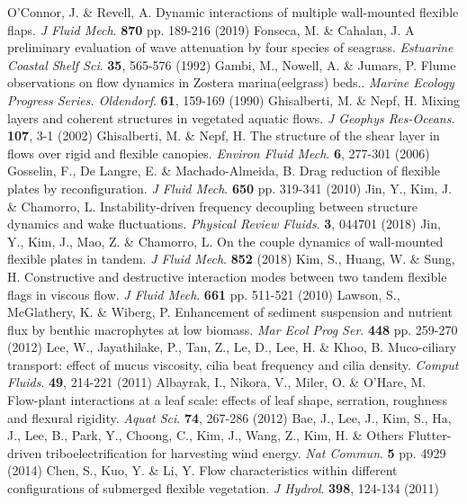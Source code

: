 \documentclass[lineno,authoryear]{FLO_v1}%
\theoremstyle{definition}
\begin{document}
\begin{Backmatter}
\begin{thebibliography}{}
O’Connor, J. \& Revell, A. Dynamic interactions of multiple wall-mounted flexible flaps. {\em J Fluid Mech}. \textbf{870} pp. 189-216 (2019)
Fonseca, M. \& Cahalan, J. A preliminary evaluation of wave attenuation by four species of seagrass. {\em Estuarine Coastal Shelf Sci}. \textbf{35}, 565-576 (1992)
Gambi, M., Nowell, A. \& Jumars, P. Flume observations on flow dynamics in Zostera marina(eelgrass) beds.. {\em Marine Ecology Progress Series. Oldendorf}. \textbf{61}, 159-169 (1990)
Ghisalberti, M. \& Nepf, H. Mixing layers and coherent structures in vegetated aquatic flows. {\em J Geophys Res-Oceans}. \textbf{107}, 3-1 (2002)
Ghisalberti, M. \& Nepf, H. The structure of the shear layer in flows over rigid and flexible canopies. {\em Environ Fluid Mech}. \textbf{6}, 277-301 (2006)
Gosselin, F., De Langre, E. \& Machado-Almeida, B. Drag reduction of flexible plates by reconfiguration. {\em J Fluid Mech}. \textbf{650} pp. 319-341 (2010)
Jin, Y., Kim, J. \& Chamorro, L. Instability-driven frequency decoupling between structure dynamics and wake fluctuations. {\em Physical Review Fluids}. \textbf{3}, 044701 (2018)
Jin, Y., Kim, J., Mao, Z. \& Chamorro, L. On the couple dynamics of wall-mounted flexible plates in tandem. {\em J Fluid Mech}. \textbf{852} (2018)
Kim, S., Huang, W. \& Sung, H. Constructive and destructive interaction modes between two tandem flexible flags in viscous flow. {\em J Fluid Mech}. \textbf{661} pp. 511-521 (2010)
Lawson, S., McGlathery, K. \& Wiberg, P. Enhancement of sediment suspension and nutrient flux by benthic macrophytes at low biomass. {\em Mar Ecol Prog Ser}. \textbf{448} pp. 259-270 (2012)
Lee, W., Jayathilake, P., Tan, Z., Le, D., Lee, H. \& Khoo, B. Muco-ciliary transport: effect of mucus viscosity, cilia beat frequency and cilia density. {\em Comput Fluids}. \textbf{49}, 214-221 (2011)
Albayrak, I., Nikora, V., Miler, O. \& O’Hare, M. Flow-plant interactions at a leaf scale: effects of leaf shape, serration, roughness and flexural rigidity. {\em Aquat Sci}. \textbf{74}, 267-286 (2012)
Bae, J., Lee, J., Kim, S., Ha, J., Lee, B., Park, Y., Choong, C., Kim, J., Wang, Z., Kim, H. \& Others Flutter-driven triboelectrification for harvesting wind energy. {\em Nat Commun}. \textbf{5} pp. 4929 (2014)
Chen, S., Kuo, Y. \& Li, Y. Flow characteristics within different configurations of submerged flexible vegetation. {\em J Hydrol}. \textbf{398}, 124-134 (2011)

\end{thebibliography}
\end{Backmatter}
\end{document}
